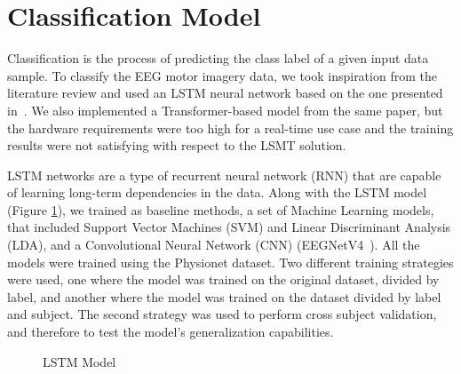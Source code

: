 \section{Classification Model}
Classification is the process of predicting the class label of a given input data sample.
To classify the EEG motor imagery data, we took inspiration from the literature review and used an LSTM neural network based on the one presented in~\cite{sharma_deep_2023}.
We also implemented a Transformer-based model from the same paper, but the hardware requirements were too high for a real-time use case and the training results were not satisfying with respect to the LSMT solution.

LSTM networks are a type of recurrent neural network (RNN) that are capable of learning long-term dependencies in the data.
Along with the LSTM model (Figure \ref{fig:lstm}), we trained as baseline methods, a set of Machine Learning models, that included Support Vector Machines (SVM) and Linear Discriminant Analysis (LDA), and a Convolutional Neural Network (CNN) (EEGNetV4~\cite{lawhern2018eegnet}).
All the models were trained using the Physionet dataset. 
Two different training strategies were used, one where the model was trained on the original dataset, divided by label, and another where the model was trained on the dataset divided by label and subject.
The second strategy was used to perform cross subject validation, and therefore to test the model's generalization capabilities.

\begin{figure}[!htbp]
    \centering
    \caption{LSTM Model}
    \label{fig:lstm}
\end{figure}

